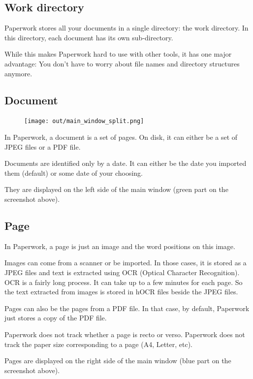 \documentclass[10pt,a4paper]{article}
\begin{document}
\subsection{Work directory}

Paperwork stores all your documents in a single directory: the work directory.
In this directory, each document has its own sub-directory.

While this makes Paperwork hard to use with other tools, it has one major
advantage: You don't have to worry about file names and directory structures
anymore.

\subsection{Document}

\begin{figure}[H]
	\texttt{[image: out/main\_window\_split.png]}
\end{figure}


In Paperwork, a document is a set of pages. On disk, it can either be a set of
JPEG files or a PDF file.

Documents are identified only by a date. It can either be the date you
imported them (default) or some date of your choosing.

They are displayed on the left side of the main window (green part on the
screenshot above).


\subsection{Page}

In Paperwork, a page is just an image and the word positions on this image.

Images can come from a scanner or be imported. In those cases, it is
stored as a JPEG files and text is extracted using OCR (Optical Character
Recognition). OCR is a fairly long process. It can take up to a few minutes for
each page. So the text extracted from images is stored in hOCR files beside
the JPEG files.

Pages can also be the pages from a PDF file. In that case, by default,
Paperwork just stores a copy of the PDF file.

Paperwork does not track whether a page is recto or verso.
Paperwork does not track the paper size corresponding to a page (A4, Letter,
etc).

Pages are displayed on the right side of the main window (blue part on the
screenshot above).
\end{document}

